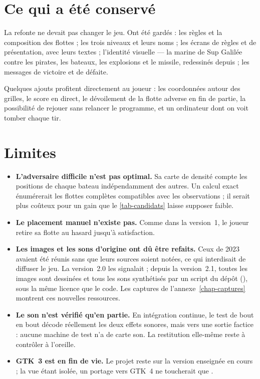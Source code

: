 \section{Ce qui a été conservé}

La refonte ne devait pas changer le jeu. Ont été gardés : les règles et la composition des
flottes ; les trois niveaux et leurs noms ; les écrans de règles et de présentation, avec
leurs textes ; l'identité visuelle --- la marine de Sup Galilée contre les pirates, les
bateaux, les explosions et le missile, redessinés depuis ; les messages de victoire et de
défaite.

Quelques ajouts profitent directement au joueur : les coordonnées autour des grilles, le
score en direct, le dévoilement de la flotte adverse en fin de partie, la possibilité de
rejouer sans relancer le programme, et un ordinateur dont on voit tomber chaque tir.

\section{Limites}

\begin{itemize}
    \item \textbf{L'adversaire difficile n'est pas optimal.} Sa carte de densité compte les
          positions de chaque bateau indépendamment des autres. Un calcul exact énumérerait
          les flottes complètes compatibles avec les observations ; il serait plus coûteux
          pour un gain que le \cref{tab-candidats} laisse supposer faible.
    \item \textbf{Le placement manuel n'existe pas.} Comme dans la version~1, le joueur
          retire sa flotte au hasard jusqu'à satisfaction.
    \item \textbf{Les images et les sons d'origine ont dû être refaits.} Ceux de 2023 avaient
          été réunis sans que leurs sources soient notées, ce qui interdisait de diffuser le
          jeu. La version~2.0 les signalait ; depuis la version~2.1, toutes les images sont
          dessinées et tous les sons synthétisés par un script du dépôt
          (), sous la même licence que le code. Les captures
          de l'annexe~\ref{chap-captures} montrent ces nouvelles ressources.
    \item \textbf{Le son n'est vérifié qu'en partie.} En intégration continue, le test de bout
          en bout décode réellement les deux effets sonores, mais vers une sortie factice :
          aucune machine de test n'a de carte son. La restitution elle-même reste à
          contrôler à l'oreille.
    \item \textbf{GTK~3 est en fin de vie.} Le projet reste sur la version enseignée en
          cours ; la vue étant isolée, un portage vers GTK~4 ne toucherait que
          .
\end{itemize}

